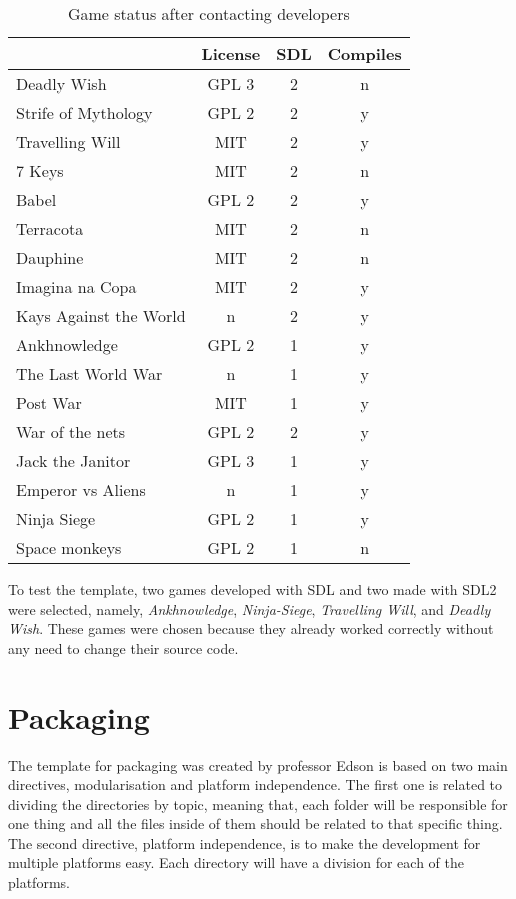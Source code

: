 \begin{table}[h!]
\centering
\caption{Game status after contacting developers}
\label{tab:final_games}
\begin{tabular}{lccc}
\toprule
\textbf{} & \multicolumn{1}{l}{\textbf{License}} & \multicolumn{1}{l}{\textbf{SDL}} & \multicolumn{1}{l}{\textbf{Compiles}} \\
\midrule
Deadly Wish & GPL 3 & 2 & n \\
Strife of Mythology & GPL 2 & 2 & y \\
Travelling Will & MIT & 2 & y \\
7 Keys & MIT & 2 & n \\
Babel & GPL 2 & 2 & y \\
Terracota & MIT & 2 & n \\
Dauphine & MIT & 2 & n \\
Imagina na Copa & MIT & 2 & y \\
Kays Against the World & n & 2 & y \\
Ankhnowledge & GPL 2 & 1 & y \\
The Last World War & n & 1 & y \\
Post War & MIT & 1 & y \\
War of the nets & GPL 2 & 2 & y \\
Jack the Janitor & GPL 3 & 1 & y \\
Emperor vs Aliens & n & 1 & y \\
Ninja Siege & GPL 2 & 1 & y \\
Space monkeys & GPL 2 & 1 & n \\
\bottomrule
\end{tabular}
\end{table}

To test the template, two games developed with SDL and two made with SDL2 were selected, namely, \textit{Ankhnowledge}, \textit{Ninja-Siege}, \textit{Travelling Will}, and \textit{Deadly Wish}. These games were chosen because they already worked correctly without any need to change their source code.

\section{Packaging}
\label{sec:packaging}

The template for packaging was created by professor Edson is based on two main directives, modularisation and platform independence. The first one is related to dividing the directories by topic, meaning that, each folder will be responsible for one thing and all the files inside of them should be related to that specific thing. The second directive, platform independence, is to make the development for multiple platforms easy. Each directory will have a division for each of the platforms.

